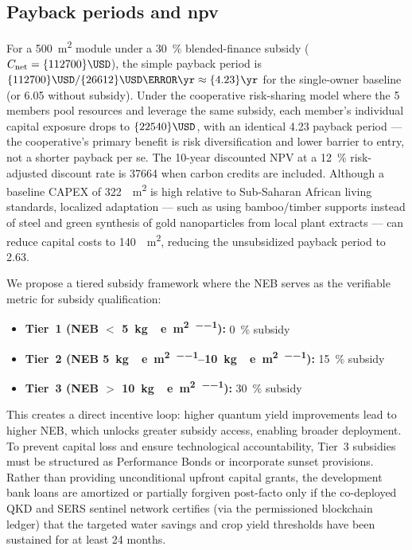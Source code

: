 \documentclass[11pt,a4paper]{article}
\begin{document}
\subsection{Payback periods and npv}

For a \qty{500}{\m\squared} module under a \qty{30}{\percent} blended-finance subsidy ($C_{\mathrm{net}} = \qty{112700}{\USD}$), the simple payback period is $\qty{112700}{\USD} / \qty{26612}{\USD\per\yr} \approx \qty{4.23}{\yr}$ for the single-owner baseline (or \qty{6.05}{\yr} without subsidy). Under the cooperative risk-sharing model where the \num{5} members pool resources and leverage the same subsidy, each member's individual capital exposure drops to $\qty{22540}{\USD}$, with an identical \qty{4.23}{\yr} payback period — the cooperative's primary benefit is risk diversification and lower barrier to entry, not a shorter payback per se. The 10-year discounted NPV at a \qty{12}{\percent} risk-adjusted discount rate is \qty{+37664}{\USD} when carbon credits are included. Although a baseline CAPEX of \qty{322}{\per\m\squared} is high relative to Sub-Saharan African living standards, localized adaptation --- such as using bamboo/timber supports instead of steel and green synthesis of gold nanoparticles from local plant extracts --- can reduce capital costs to \qty{140}{\per\m\squared}, reducing the unsubsidized payback period to \qty{2.63}{\yr}.

We propose a tiered subsidy framework where the NEB serves as the verifiable metric for subsidy qualification:

\begin{itemize}
\item \textbf{Tier~1 (NEB $<$ \qty{5}{\kg{}e\per\m\squared\per\yr}):} \qty{0}{\percent} subsidy
\item \textbf{Tier~2 (NEB \qtyrange{5}{10}{\kg{}e\per\m\squared\per\yr}):} \qty{15}{\percent} subsidy
\item \textbf{Tier~3 (NEB $>$ \qty{10}{\kg{}e\per\m\squared\per\yr}):} \qty{30}{\percent} subsidy
\end{itemize}

This creates a direct incentive loop: higher quantum yield improvements lead to higher NEB, which unlocks greater subsidy access, enabling broader deployment. To prevent capital loss and ensure technological accountability, Tier~3 subsidies must be structured as Performance Bonds or incorporate sunset provisions. Rather than providing unconditional upfront capital grants, the development bank loans are amortized or partially forgiven post-facto only if the co-deployed QKD and SERS sentinel network certifies (via the permissioned blockchain ledger) that the targeted water savings and crop yield thresholds have been sustained for at least 24 months.
\end{document}
